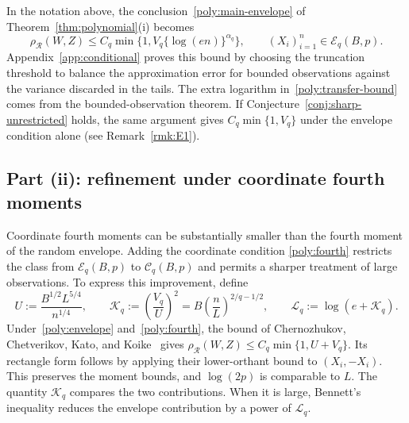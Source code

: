 \documentclass[11pt,letterpaper]{article}
\newenvironment{recovered}{}{}
\theoremstyle{remark}
\newcommand{\rh}{\rho_{\mathcal R}}
\begin{document}
\begin{recovered}
In the notation above, the conclusion~\eqref{poly:main-envelope} of
Theorem~\ref{thm:polynomial}\textup{(i)} becomes
\begin{equation}
 \rh(W,Z)\le C_q\min\{1,V_q\{\log(en)\}^{\alpha_q}\},
 \qquad (X_i)_{i=1}^n\in\mathcal E_q(B,p).
 \label{poly:transfer-bound}
\end{equation}
Appendix~\ref{app:conditional} proves this bound by choosing the
truncation threshold to balance the approximation error for bounded
observations against the variance discarded in the tails. The extra
logarithm in~\eqref{poly:transfer-bound} comes from the
bounded-observation theorem. If Conjecture~\ref{conj:sharp-unrestricted}
holds, the same argument gives \(C_q\min\{1,V_q\}\) under the
envelope condition alone {(see Remark~\ref{rmk:E1})}.
\end{recovered}

\subsection{\texorpdfstring{{Part (ii): refinement under coordinate fourth moments}}{Part (ii): refinement under coordinate fourth moments}}\label{poly:bennett-sec}

\begin{recovered}
Coordinate fourth moments can be substantially smaller than the fourth
moment of the random envelope. Adding the coordinate condition
\eqref{poly:fourth} restricts the class from \(\mathcal E_q(B,p)\)
to \(\mathcal C_q(B,p)\) and permits a sharper treatment of large
observations. To express this improvement, define
\end{recovered}
\begin{equation}
 U:=\frac{B^{1/2}L^{5/4}}{n^{1/4}},\qquad
 \mathcal K_q:=\left(\frac{V_q}{U}\right)^2
     =B\left(\frac nL\right)^{2/q-1/2},\qquad
 \mathcal L_q:=\log(e+\mathcal K_q).
 \label{poly:bennett-parameters}
\end{equation}
Under~\eqref{poly:envelope} and~\eqref{poly:fourth}, the bound of
Chernozhukov, Chetverikov, Kato, and
Koike~\cite[Theorem~2.5]{CCKK2022} gives
\(\rh(W,Z)\le C_q\min\{1,U+V_q\}\).
Its rectangle form follows by applying their lower-orthant bound
to \((X_i,-X_i)\). This preserves the moment bounds, and
\(\log(2p)\) is comparable to \(L\).
The quantity \(\mathcal K_q\) compares the two contributions.
When it is large, Bennett's inequality reduces the envelope
contribution by a power of \(\mathcal L_q\).
\end{document}
